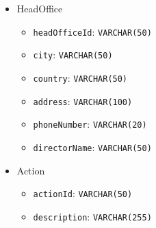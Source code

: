 \documentclass{assignment}
\begin{document}
\noindent
\begin{minipage}[t]{0.49\textwidth}
    \begin{itemize}[noitemsep]
        \item HeadOffice
            \begin{itemize}[noitemsep, leftmargin=1em]
                \item \texttt{headOfficeId}: {\small\texttt{VARCHAR(50)}}
                \item \texttt{city}: {\small\texttt{VARCHAR(50)}}
                \item \texttt{country}: {\small\texttt{VARCHAR(50)}}
                \item \texttt{address}: {\small\texttt{VARCHAR(100)}}
                \item \texttt{phoneNumber}: {\small\texttt{VARCHAR(20)}}
                \item \texttt{directorName}: {\small\texttt{VARCHAR(50)}}
            \end{itemize}
        \item Action
            \begin{itemize}[noitemsep, leftmargin=1em]
                \item \texttt{actionId}: {\small\texttt{VARCHAR(50)}}
                \item \texttt{description}: {\small\texttt{VARCHAR(255)}}
            \end{itemize}
    \end{itemize}
\end{minipage}
\hfill
\end{document}
